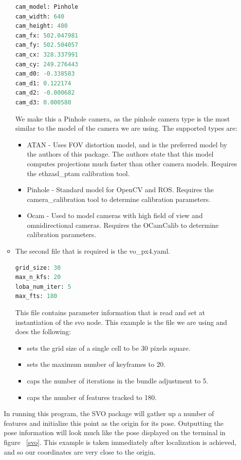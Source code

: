 \begin{itemize}
\begin{itemize}
\begin{lstlisting}[language=python]
cam_model: Pinhole
cam_width: 640
cam_height: 480
cam_fx: 502.047981
cam_fy: 502.504057
cam_cx: 328.337991
cam_cy: 249.276443
cam_d0: -0.338583
cam_d1: 0.122174
cam_d2: -0.000682
cam_d3: 0.000580
\end{lstlisting}
We make this a Pinhole camera, as the pinhole camera type is the most similar to the model of the camera we are using. The supported types are:
\begin{itemize}
\item ATAN - Uses FOV distortion model, and is the preferred model by the authors of this package. The authors state that this model computes projections much faster than other camera models. Requires the ethzasl\_ptam calibration tool.
\item Pinhole - Standard model for OpenCV and ROS. Requires the camera\_calibration tool to determine calibration parameters.
\item Ocam - Used to model cameras with high field of view and omnidirectional cameras. Requires the OCamCalib to determine calibration parameters.
\end{itemize} 
\item The second file that is required is the vo\_px4.yaml.
\begin{lstlisting}[language=python]
grid_size: 30
max_n_kfs: 20
loba_num_iter: 5
max_fts: 180
\end{lstlisting}
This file contains parameter information that is read and set at instantiation of the svo node. This example is the file we are using and does the following: 
\begin{itemize}
\item sets the grid size of a single cell to be 30 pixels square.
\item sets the maximum number of keyframes to 20.
\item caps the number of iterations in the bundle adjustment to 5.
\item caps the number of features tracked to 180.
\end{itemize}
\end{itemize}
In running this program, the SVO package will gather up a number of features and initialize this point as the origin for its pose. Outputting the pose information will look much like the pose displayed on the terminal in figure ~\ref{svo}. This example is taken immediately after localization is achieved, and so our coordinates are very close to the origin.\\


\end{itemize}
